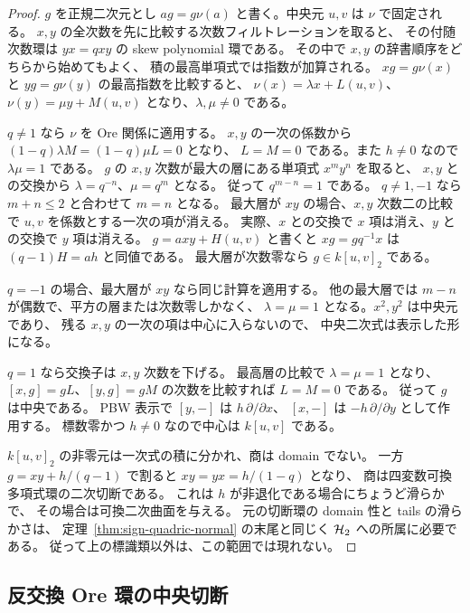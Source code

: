 \begin{proof}
$g$ を正規二次元とし $ag=g\nu(a)$ と書く。中央元 $u,v$ は $\nu$ で固定される。
$x,y$ の全次数を先に比較する次数フィルトレーションを取ると、
その付随次数環は $yx=qxy$ の skew polynomial 環である。
その中で $x,y$ の辞書順序をどちらから始めてもよく、
積の最高単項式では指数が加算される。
$xg=g\nu(x)$ と $yg=g\nu(y)$ の最高指数を比較すると、
$\nu(x)=\lambda x+L(u,v)$、$\nu(y)=\mu y+M(u,v)$
となり、$\lambda,\mu\ne0$ である。

$q\ne1$ なら $\nu$ を Ore 関係に適用する。
$x,y$ の一次の係数から $(1-q)\lambda M=(1-q)\mu L=0$ となり、
$L=M=0$ である。また $h\ne0$ なので $\lambda\mu=1$ である。
$g$ の $x,y$ 次数が最大の層にある単項式 $x^m y^n$ を取ると、
$x,y$ との交換から $\lambda=q^{-n}$、$\mu=q^m$ となる。
従って $q^{m-n}=1$ である。
$q\ne1,-1$ なら $m+n\le2$ と合わせて $m=n$ となる。
最大層が $xy$ の場合、$x,y$ 次数二の比較で
$u,v$ を係数とする一次の項が消える。
実際、$x$ との交換で $x$ 項は消え、$y$ との交換で $y$ 項は消える。
$g=a xy+H(u,v)$ と書くと
$xg=gq^{-1}x$ は $(q-1)H=ah$ と同値である。
最大層が次数零なら $g\in k[u,v]_2$ である。

$q=-1$ の場合、最大層が $xy$ なら同じ計算を適用する。
他の最大層では $m-n$ が偶数で、平方の層または次数零しかなく、
$\lambda=\mu=1$ となる。$x^2,y^2$ は中央元であり、
残る $x,y$ の一次の項は中心に入らないので、
中央二次式は表示した形になる。

$q=1$ なら交換子は $x,y$ 次数を下げる。
最高層の比較で $\lambda=\mu=1$ となり、
$[x,g]=gL$、$[y,g]=gM$ の次数を比較すれば $L=M=0$ である。
従って $g$ は中央である。
PBW 表示で $[y,-]$ は $h\,\partial/\partial x$、
$[x,-]$ は $-h\,\partial/\partial y$ として作用する。
標数零かつ $h\ne0$ なので中心は $k[u,v]$ である。

$k[u,v]_2$ の非零元は一次式の積に分かれ、商は domain でない。
一方 $g=xy+h/(q-1)$ で割ると $xy=yx=h/(1-q)$ となり、
商は四変数可換多項式環の二次切断である。
これは $h$ が非退化である場合にちょうど滑らかで、
その場合は可換二次曲面を与える。
元の切断環の domain 性と tails の滑らかさは、
定理~\ref{thm:sign-quadric-normal} の末尾と同じく $\mathcal H_2$ への所属に必要である。
従って上の標識類以外は、この範囲では現れない。
\end{proof}

\subsection{反交換 Ore 環の中央切断}
\label{subsec:ore-central-anticommuting}

